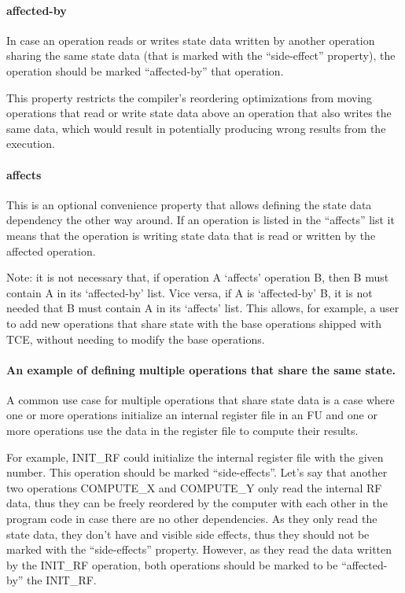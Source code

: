 \documentclass[twoside]{tceusermanual}
\begin{document}
\paragraph{affected-by}

In case an operation reads or writes state data written by another 
operation sharing the same state data (that is marked with the
``side-effect'' property), the operation should be marked ``affected-by''
that operation. 

This property restricts the compiler's reordering optimizations 
from moving operations that read or write state data above an operation
that also writes the same data, which would result in potentially
producing wrong results from the execution.

\paragraph{affects}

This is an optional convenience property that allows defining
the state data dependency the other way around. If an operation
is listed in the ``affects'' list it means that the operation
is writing state data that is read or written by the affected operation.

Note: it is not necessary that, if operation A `affects' operation B, then B
must contain A in its `affected-by' list.  Vice versa, if A is `affected-by'
B, it is not needed that B must contain A in its `affects' list. This
allows, for example, a user to add new operations that share state with 
the base operations shipped with TCE, without needing to modify the base
operations.

\paragraph{An example of defining multiple operations that share the
same state.} A common use case for multiple operations that share
state data is a case where one or more operations initialize an
internal register file in an FU and one or more operations use the
data in the register file to compute their results.

For example, INIT\_RF could initialize the internal register
file with the given number. This operation should be marked
``side-effects''. Let's say that another two operations COMPUTE\_X and
COMPUTE\_Y only read the internal RF data, thus they can be freely
reordered by the computer with each other in the program code in case
there are no other dependencies. As they only read the state data,
they don't have and visible side effects, thus they should not
be marked with the ``side-effects'' property. However, as they read
the data written by the INIT\_RF operation, both operations should
be marked to be ``affected-by'' the INIT\_RF.
\end{document}
